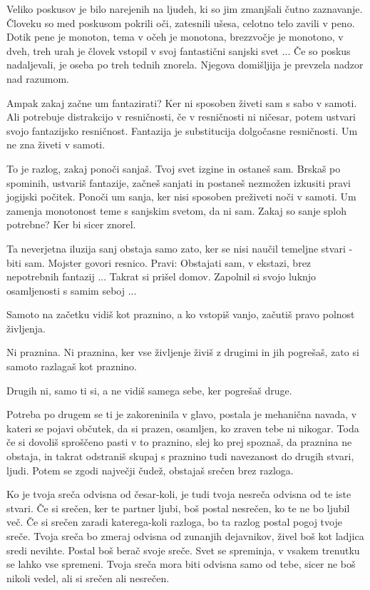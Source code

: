 Veliko poskusov je bilo narejenih na ljudeh, ki so jim zmanjšali čutno zaznavanje. Človeku so med poskusom pokrili oči, zatesnili ušesa, celotno telo zavili v peno. Dotik pene je monoton, tema v očeh je monotona, brezzvočje je monotono, v dveh, treh urah je človek vstopil v svoj fantastični sanjski svet ... Če so poskus nadaljevali, je oseba po treh tednih znorela. Njegova domišljija je prevzela nadzor nad razumom. 

Ampak zakaj začne um fantazirati? Ker ni sposoben živeti sam s sabo v samoti. Ali potrebuje distrakcijo v resničnosti, če v resničnosti ni ničesar, potem ustvari svojo fantazijsko resničnost. Fantazija je substitucija dolgočasne resničnosti. Um ne zna živeti v samoti. 

To je razlog, zakaj ponoči sanjaš. Tvoj svet izgine in ostaneš sam. Brskaš po spominih, ustvariš fantazije, začneš sanjati in postaneš nezmožen izkusiti pravi jogijski počitek. Ponoči um sanja, ker nisi sposoben preživeti noči v samoti. Um zamenja monotonost teme s sanjskim svetom, da ni sam. Zakaj so sanje sploh potrebne? Ker bi sicer znorel. 

Ta neverjetna iluzija sanj obstaja samo zato, ker se nisi naučil temeljne stvari - biti sam. Mojster govori resnico. Pravi:  Obstajati sam, v ekstazi, brez nepotrebnih fantazij  ... Takrat si prišel domov. Zapolnil si svojo luknjo osamljenosti s samim seboj ... 

Samoto na začetku vidiš kot praznino, a ko vstopiš vanjo, začutiš pravo polnost življenja. 

Ni praznina. Ni praznina, ker vse življenje živiš z drugimi in jih pogrešaš, zato si samoto razlagaš kot praznino. 

Drugih ni, samo ti si, a ne vidiš samega sebe, ker pogrešaš druge. 

Potreba po drugem se ti je zakoreninila v glavo, postala je mehanična navada, v kateri se pojavi občutek, da si prazen, osamljen, ko zraven tebe ni nikogar. Toda če si dovoliš sproščeno pasti v to praznino, slej ko prej spoznaš, da praznina ne obstaja, in takrat odstraniš skupaj s praznino tudi navezanost do drugih stvari, ljudi. Potem se zgodi največji čudež, obstajaš srečen brez razloga. 

Ko je tvoja sreča odvisna od česar-koli, je tudi tvoja nesreča odvisna od te iste stvari. Če si srečen, ker te partner ljubi, boš postal nesrečen, ko te ne bo ljubil več. Če si srečen zaradi katerega-koli razloga, bo ta razlog postal pogoj tvoje sreče. Tvoja sreča bo zmeraj odvisna od zunanjih dejavnikov, živel boš kot ladjica sredi nevihte. Postal boš berač svoje sreče. Svet se spreminja, v vsakem trenutku se lahko vse spremeni. Tvoja sreča mora biti odvisna samo od tebe, sicer ne boš nikoli vedel, ali si srečen ali nesrečen. 

